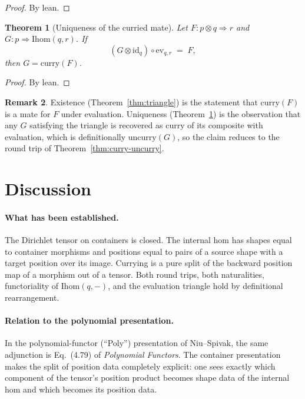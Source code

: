 \documentclass[11pt,a4paper]{article}
\theoremstyle{plain}
\newtheorem{theorem}{Theorem}[section]
\theoremstyle{definition}
\newtheorem{remark}[theorem]{Remark}
\newcommand{\id}{\mathrm{id}}
\newcommand{\Ihom}{\mathrm{Ihom}}
\begin{document}
\begin{proof}
By lean.
\end{proof}

\begin{theorem}[Uniqueness of the curried mate]\label{thm:unique}
Let $F : p \otimes q \Rightarrow r$ and
$G : p \Rightarrow \Ihom(q,r)$. If
\begin{equation}
  (G \otimes \id_q) \circ \mathrm{ev}_{q,r} \;=\; F,
\end{equation}
then $G = \mathrm{curry}(F)$.
\end{theorem}

\begin{proof}
By lean.
\end{proof}

\begin{remark}
Existence (Theorem~\ref{thm:triangle}) is the statement that
$\mathrm{curry}(F)$ is a mate for $F$ under evaluation. Uniqueness
(Theorem~\ref{thm:unique}) is the observation that any $G$ satisfying the
triangle is recovered as $\mathrm{curry}$ of its composite with evaluation,
which is definitionally $\mathrm{uncurry}(G)$, so the claim reduces to the
round trip of Theorem~\ref{thm:curry-uncurry}.
\end{remark}

\section{Discussion}

\paragraph{What has been established.}
The Dirichlet tensor on containers is closed. The internal hom has shapes
equal to container morphisms and positions equal to pairs of a source shape
with a target position over its image. Currying is a pure split of the
backward position map of a morphism out of a tensor. Both round trips, both
naturalities, functoriality of $\Ihom(q,-)$, and the evaluation triangle
hold by definitional rearrangement.

\paragraph{Relation to the polynomial presentation.}
In the polynomial-functor (``Poly'') presentation of Niu--Spivak, the same
adjunction is Eq.~(4.79) of \emph{Polynomial Functors}. The container
presentation makes the split of position data completely explicit: one sees
exactly which component of the tensor's position product becomes shape data
of the internal hom and which becomes its position data.
\end{document}
